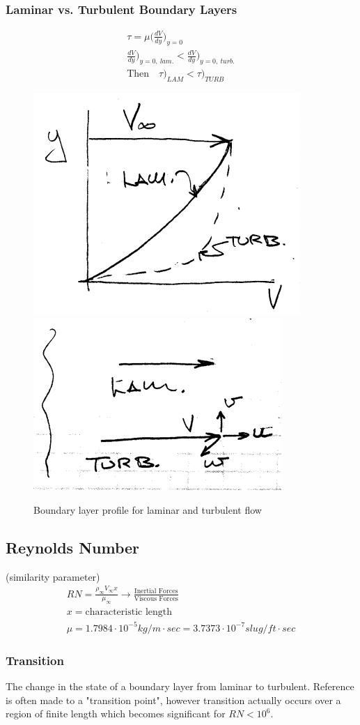 \documentclass[draft=false, titlepage]{article}
\begin{document}
\subsubsection{Laminar vs. Turbulent Boundary Layers}
\begin{gather*}
\tau = \mu \Big(\frac{dV}{dy}\Big)_{y=0}\\
\frac{dV}{dy}\Big)_{y=0,\ lam.} < \frac{dV}{dy}\Big)_{y=0,\ turb.}\\
\text{Then}\quad \tau\big)_{LAM} < \tau\big)_{TURB}
\end{gather*}
\begin{figure}[ht]
	\centering
	\includegraphics[width=0.3\linewidth]{Figures/p17_velocityProfile2.PNG}
	\includegraphics[width=0.3\linewidth]{Figures/p17_velocityProfile3.PNG}
	\caption{Boundary layer profile for laminar and turbulent flow}
	\label{fig:p17_boundaryLayer23}
\end{figure}

\subsection{Reynolds Number} (similarity parameter)
\begin{gather}
RN = \frac{\rho_\infty V_\infty x}{\mu_\infty} \rightarrow \frac{\text{Inertial Forces}}{\text{Viscous Forces}}\\
x = \text{characteristic length}\\
\mu = 1.7984\cdot 10^{-5} kg/m\cdot sec = 3.7373 \cdot 10^{-7} slug/ft\cdot sec
\label{eq:Reynolds}
\end{gather}
\subsubsection{Transition}
The change in the state of a boundary layer from laminar to turbulent. Reference is often made to a "transition point", however transition actually occurs over a region of finite length which becomes significant for $RN < 10^6$.
\end{document}

